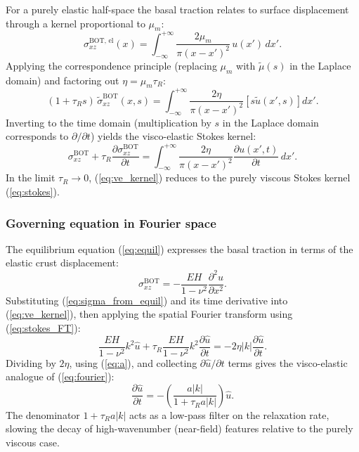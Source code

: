 \documentclass[extra]{gji}
\begin{document}
For a purely elastic half-space the basal traction relates to surface
displacement through a kernel proportional to $\mu_m$:
\begin{equation}
\sigma_{xz}^{\text{BOT, el}}(x) =
  \int_{-\infty}^{+\infty}\frac{2\mu_m}{\pi(x-x')^2}\,u(x')\,dx'.
\label{eq:elastic_kernel}
\end{equation}
Applying the correspondence principle (replacing $\mu_m$ with $\tilde{\mu}(s)$
in the Laplace domain) and factoring out $\eta = \mu_m\tau_R$:
\begin{equation}
(1+\tau_R s)\,\tilde{\sigma}_{xz}^{\text{BOT}}(x,s) =
  \int_{-\infty}^{+\infty}\frac{2\eta}{\pi(x-x')^2}
  \left[s\tilde{u}(x',s)\right]dx'.
\label{eq:ve_kernel_laplace}
\end{equation}
Inverting to the time domain (multiplication by $s$ in the Laplace domain
corresponds to $\partial/\partial t$) yields the visco-elastic Stokes kernel:
\begin{equation}
\sigma_{xz}^{\text{BOT}} + \tau_R\frac{\partial\sigma_{xz}^{\text{BOT}}}{\partial t}
= \int_{-\infty}^{+\infty}\frac{2\eta}{\pi(x-x')^2}
  \frac{\partial u(x',t)}{\partial t}\,dx'.
\label{eq:ve_kernel}
\end{equation}
In the limit $\tau_R\to 0$, (\ref{eq:ve_kernel}) reduces to the purely viscous
Stokes kernel (\ref{eq:stokes}).

\subsubsection{Governing equation in Fourier space}

The equilibrium equation (\ref{eq:equil}) expresses the basal traction in terms
of the elastic crust displacement:
\begin{equation}
\sigma_{xz}^{\text{BOT}} = -\frac{EH}{1-\nu^2}\frac{\partial^2 u}{\partial x^2}.
\label{eq:sigma_from_equil}
\end{equation}
Substituting (\ref{eq:sigma_from_equil}) and its time derivative into
(\ref{eq:ve_kernel}), then applying the spatial Fourier transform
using (\ref{eq:stokes_FT}):
\begin{equation}
\frac{EH}{1-\nu^2}k^2\hat{u}
+ \tau_R\frac{EH}{1-\nu^2}k^2\frac{\partial\hat{u}}{\partial t}
= -2\eta|k|\frac{\partial\hat{u}}{\partial t}.
\label{eq:maxwell_fourier_pre}
\end{equation}
Dividing by $2\eta$, using (\ref{eq:a}), and collecting
$\partial\hat{u}/\partial t$ terms gives the visco-elastic analogue of
(\ref{eq:fourier}):
\begin{equation}
\frac{\partial\hat{u}}{\partial t}
= -\left(\frac{a|k|}{1+\tau_R a|k|}\right)\hat{u}.
\label{eq:maxwell_fourier}
\end{equation}
The denominator $1+\tau_R a|k|$ acts as a low-pass filter on the relaxation
rate, slowing the decay of high-wavenumber (near-field) features relative to
the purely viscous case.
\end{document}
